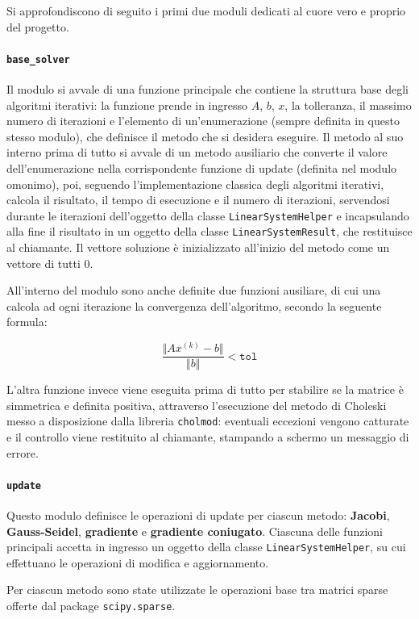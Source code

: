 \documentclass[12pt]{article}
\begin{document}
Si approfondiscono di seguito i primi due moduli dedicati al cuore vero e proprio del progetto.

\paragraph{\texttt{base\_solver}} Il modulo si avvale di una funzione principale che contiene la struttura base degli algoritmi iterativi: la funzione prende in ingresso  $A$, $b$, $x$, la tolleranza, il massimo numero di iterazioni e l'elemento di un'enumerazione (sempre definita in questo stesso modulo), che definisce il metodo che si desidera eseguire. Il metodo al suo interno prima di tutto si avvale di un metodo ausiliario che converte il valore dell'enumerazione nella corrispondente funzione di update (definita nel modulo omonimo), poi, seguendo l'implementazione classica degli algoritmi iterativi, calcola il risultato, il tempo di esecuzione e il numero di iterazioni, servendosi durante le iterazioni dell'oggetto della classe \texttt{LinearSystemHelper} e incapsulando alla fine il risultato in un oggetto della classe \texttt{LinearSystemResult}, che restituisce al chiamante. Il vettore soluzione è inizializzato all'inizio del metodo come un vettore di tutti 0.

All'interno del modulo sono anche definite due funzioni ausiliare, di cui una calcola ad ogni iterazione la convergenza dell'algoritmo, secondo la seguente formula:

\[
    \frac{\Vert Ax^{(k)}-b \Vert}{\Vert b \Vert} < \texttt{tol}
\]

L'altra funzione invece viene eseguita prima di tutto per stabilire se la matrice è simmetrica e definita positiva, attraverso l'esecuzione del metodo di Choleski messo a disposizione dalla libreria \texttt{cholmod}: eventuali eccezioni vengono catturate e il controllo viene restituito al chiamante, stampando a schermo un messaggio di errore.

\paragraph{\texttt{update}} Questo modulo definisce le operazioni di update per ciascun metodo: \textbf{Jacobi}, \textbf{Gauss-Seidel}, \textbf{gradiente} e \textbf{gradiente coniugato}. Ciascuna delle funzioni principali accetta in ingresso un oggetto della classe \texttt{LinearSystemHelper}, su cui effettuano le operazioni di modifica e aggiornamento. 

Per ciascun metodo sono state utilizzate le operazioni base tra matrici sparse offerte dal package \texttt{scipy.sparse}. 
\end{document}
